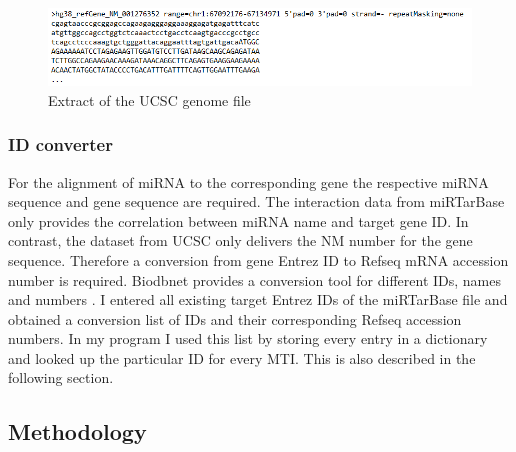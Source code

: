 \documentclass[12pt]{article}
\begin{document}
\begin{figure}[h]
\centering
\includegraphics[width=\textwidth]{results/ucsc.png}
\caption{Extract of the UCSC genome file}
\label{ucsc_scrot}
\end{figure}


\vspace{1cm}



\subsubsection{ID converter}
\label{sec:id}
For the alignment of miRNA to the corresponding gene the respective miRNA sequence and gene sequence are required. The interaction data from miRTarBase only provides the correlation between miRNA name and target gene ID. In contrast, the dataset from UCSC only delivers the NM number for the gene sequence. Therefore a conversion from gene Entrez ID to Refseq mRNA accession number is required. Biodbnet provides a conversion tool for different IDs, names and numbers \cite{biodb}. I entered all existing target Entrez IDs of the miRTarBase file and obtained a conversion list of IDs and their corresponding Refseq accession numbers. In my program I used this list by storing every entry in a dictionary and looked up the particular ID for every MTI. This is also described in the following section.
 


\vspace{1cm}


\subsection{Methodology}
\label{sec:meth}
\end{document}
